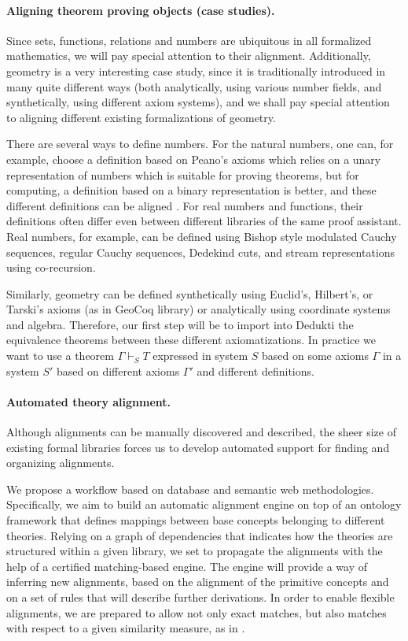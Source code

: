 \paragraph*{Aligning theorem proving objects (case studies).}
Since sets, functions, relations and numbers are ubiquitous in all
formalized mathematics, we will pay special attention to their
alignment. Additionally, geometry is a very interesting case study,
since it is traditionally introduced in many quite different ways
(both analytically, using various number fields, and synthetically,
using different axiom systems), and we shall pay special attention to
aligning different existing formalizations of geometry.

There are several ways to define numbers. For the natural numbers, one
can, for example, choose a definition based on Peano's axioms which
relies on a unary representation of numbers which is suitable for
proving theorems, but for computing, a definition based on a binary
representation is better, and these different definitions can be
aligned \cite{magaud03DataRepresentation}. For real numbers and
functions, their definitions often differ even between different
libraries of the same proof assistant.  Real numbers, for example, can
be defined using Bishop style modulated Cauchy sequences, regular
Cauchy sequences, Dedekind cuts, and stream representations using
co-recursion.

Similarly, geometry can be defined synthetically using Euclid's,
Hilbert's, or Tarski's axioms (as in GeoCoq library) or analytically
using coordinate systems and algebra. Therefore, our first step will
be to import into Dedukti the equivalence theorems between these
different axiomatizations. In practice we want to use a theorem
$\Gamma \vdash_S T$ expressed in system $S$ based on some axioms
$\Gamma$ in a system $S'$ based on different axioms $\Gamma'$ and
different definitions.

\paragraph*{Automated theory alignment.}
Although alignments can be manually discovered and described, the
sheer size of existing formal libraries forces us to develop automated
support for finding and organizing alignments.

We propose a workflow based on database and semantic web
methodologies. Specifically, we aim to build an automatic alignment
engine on top of an ontology framework that defines mappings between
base concepts belonging to different theories. Relying on a graph of
dependencies that indicates how the theories are structured within a
given library, we set to propagate the alignments with the help of a
certified matching-based engine. The engine will provide a way of
inferring new alignments, based on the alignment of the primitive
concepts and on a set of rules that will describe further
derivations. In order to enable flexible alignments, we are prepared
to allow not only exact matches, but also matches with respect to a
given similarity measure, as in \cite{GAUTHIER201989}.

